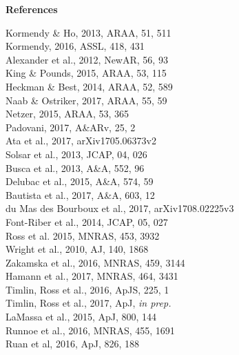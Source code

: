 \documentclass[oneside, a4paper, onecolumn, 11pt]{article}
\begin{document}
{\newpage
\begin{center}
\medskip
 \medskip
 {\large \bf References}
    \vspace{-10pt}
\end{center}
\begin{multicols}{2}[]
\noindent
{}\rbrack Kormendy \& Ho, 2013, ARAA, 51, 511\\
\rbrack Kormendy,  2016, ASSL, 418, 431\\
\rbrack Alexander et al., 2012, NewAR, 56, 93\\
\rbrack King \& Pounds, 2015, ARAA, 53, 115 \\
\rbrack Heckman \& Best, 2014, ARAA, 52, 589\\
\rbrack Naab \& Ostriker, 2017, ARAA, 55, 59 \\
\rbrack Netzer, 2015, ARAA, 53,  365\\
\rbrack Padovani, 2017, A\&ARv, 25, 2\\
\rbrack Ata et al., 2017, arXiv1705.06373v2\\
\rbrack Solsar et al., 2013, JCAP, 04, 026 \\
\rbrack Busca et al.,  2013, A\&A, 552, 96 \\
\rbrack Delubac et al.,  2015, A\&A, 574, 59 \\
\rbrack Bautista et al., 2017, A\&A, 603, 12 \\
\rbrack du Mas des Bourboux et al., 2017, arXiv1708.02225v3\\
\rbrack Font-Riber et al., 2014, JCAP, 05, 027\\
\rbrack Ross et al. 2015, MNRAS, 453, 3932\\
\rbrack Wright et al., 2010, AJ, 140, 1868\\
\rbrack Zakamska et al., 2016, MNRAS, 459, 3144\\
\rbrack Hamann et al., 2017, MNRAS, 464, 3431\\
\rbrack Timlin, Ross et al., 2016, ApJS, 225, 1\\
\rbrack Timlin, Ross et al., 2017, ApJ, {\it in prep.}\\
\rbrack LaMassa et al., 2015, ApJ, 800, 144\\
\rbrack Runnoe et al., 2016, MNRAS, 455, 1691\\
\rbrack Ruan et al, 2016, ApJ, 826, 188\\

\end{multicols}}
\end{document}
